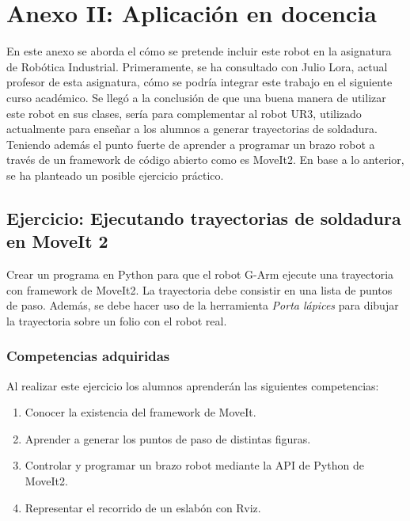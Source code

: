 \chapter*{Anexo II: Aplicación en docencia}
\label{cap:anexoii}

\noindent En este anexo se aborda el cómo se pretende incluir este robot en la asignatura de Robótica Industrial. Primeramente, 
se ha consultado con Julio Lora, actual profesor de esta asignatura, cómo se podría integrar este trabajo en el siguiente curso académico. Se llegó 
a la conclusión de que una buena manera de utilizar este robot en sus clases, sería para complementar al robot UR3, utilizado actualmente 
para enseñar a los alumnos a generar trayectorias de soldadura. Teniendo además el punto fuerte de aprender a programar un brazo robot a través de un framework 
de código abierto como es MoveIt2. En base a lo anterior, se ha planteado un posible ejercicio práctico.

\section*{Ejercicio: Ejecutando trayectorias de soldadura en MoveIt 2}
\noindent Crear un programa en Python para que el robot G-Arm ejecute una trayectoria con framework de MoveIt2. La trayectoria debe consistir 
en una lista de puntos de paso. Además, se debe hacer uso de la herramienta \textit{Porta lápices} para dibujar la trayectoria sobre un folio 
con el robot real. 

\subsection*{Competencias adquiridas}
\noindent Al realizar este ejercicio los alumnos aprenderán las siguientes competencias:
\begin{enumerate}
    \item Conocer la existencia del framework de MoveIt.
    \item Aprender a generar los puntos de paso de distintas figuras.
    \item Controlar y programar un brazo robot mediante la API de Python de MoveIt2.
    \item Representar el recorrido de un eslabón con Rviz.    
\end{enumerate}

\newpage
